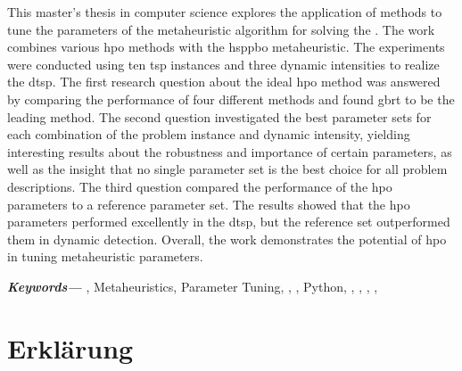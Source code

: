\documentclass[
  fontsize=12pt,
  a4paper,  %
  twoside,  %
  bibliography=totoc,
  headsepline,
  cleardoublepage=empty,
  parskip=half,
  draft=false
]{scrbook}
\begin{document}
This master's thesis in computer science explores the application of  methods to tune the parameters of the  metaheuristic algorithm for solving the . The work combines various \gls{hpo} methods with the \gls{hsppbo} metaheuristic. The experiments were conducted using ten \gls{tsp} instances and three dynamic intensities to realize the \gls{dtsp}. The first research question about the ideal \gls{hpo} method was answered by comparing the performance of four different methods and found \gls{gbrt} to be the leading method. The second question investigated the best parameter sets for each combination of the problem instance and dynamic intensity, yielding interesting results about the robustness and importance of certain parameters, as well as the insight that no single parameter set is the best choice for all problem descriptions. The third question compared the performance of the \gls{hpo} parameters to a reference parameter set. The results showed that the \gls{hpo} parameters performed excellently in the \gls{dtsp}, but the reference set outperformed them in dynamic detection. Overall, the work demonstrates the potential of \gls{hpo} in tuning metaheuristic parameters.

\small	
\textbf{\textit{Keywords---}}
 , Metaheuristics, Parameter Tuning, ,  , Python, , , , , 

\printbibliography


\printnoidxglossaries

\listoffigures
\listoftables


\listofalgorithms %


\appendix





\chapter*{Erklärung}
\end{document}
